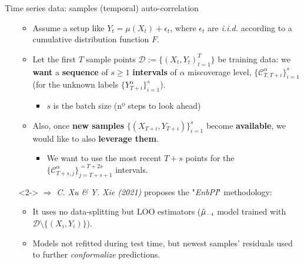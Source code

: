 \documentclass{beamer}
\renewcommand{\a}{\alpha}
\begin{document}
\begin{frame}{Time series data: samples (temporal) auto-correlation}
\begin{itemize}%
    \item[] 
    \begin{itemize}%
        \item Assume a setup like $Y_t = \mu\left(X_t\right) + \epsilon_t$, where $\epsilon_t$ are \textit{i.i.d.} according to a cumulative distribution function $F$. 
        \item Let the first $T$ sample points $\mathcal{D}:=\{\left(X_t, Y_t\right)_{t=1}^T\}$ be training data: we \textbf{want} a \textbf{sequence} of $s\geq 1$ \textbf{intervals} of $\a$ miscoverage level, $\{\mathcal{C}^\alpha_{T,T+i}\}_{i=1}^s$ (for the unknown labels $\{{Y}^\alpha_{T+i}\}_{i=1}^s$).
        \begin{itemize}%
            \item $s$ is the batch size (nº steps to look ahead)
        \end{itemize}
        \item Also, once \textbf{new samples} $\{\left(X_{T+i}, Y_{T+i}\right)\}_{i=1}^s$ become \textbf{available}, we would like to also \textbf{leverage them}.
        \begin{itemize}%
            \item We want to use the most recent $T+s$ points for the $\{\mathcal{C}^\alpha_{T+s,j}\}_{j=T+s+1}^{=T+2s}$ intervals.
        \end{itemize}
    \end{itemize}
    \item[]<2-> $\Longrightarrow$ \textit{C. Xu \& Y. Xie (2021)} %
    proposes the "\textit{EnbPI}" methodology: 
    \begin{itemize}%
        \item It uses no data-splitting but LOO estimators ($\Hat{\mu}_{-i}$ model trained with $\mathcal{D}\setminus \{(X_i, Y_i)\}$).
        \item Models not refitted during test time, but newest samples' residuals used to further \textit{conformalize} predictions.
    \end{itemize}
        
\end{itemize}
\end{frame}

\end{document}
